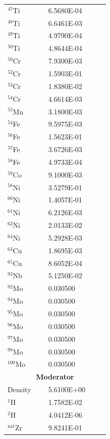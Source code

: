 \documentclass[8pt,a5paper]{article}
\begin{document}
\begin{longtable}{|m{0.3\linewidth}|m{0.45\linewidth}|}
    $^{47}$Ti & \SI{6.5680E-04}{} \\
    $^{48}$Ti & \SI{6.6461E-03}{} \\
    $^{49}$Ti & \SI{4.9790E-04}{} \\
    $^{50}$Ti & \SI{4.8644E-04}{} \\
    $^{50}$Cr & \SI{7.9300E-03}{} \\
    $^{52}$Cr & \SI{1.5903E-01}{} \\
    $^{53}$Cr & \SI{1.8380E-02}{} \\
    $^{54}$Cr & \SI{4.6614E-03}{} \\
    $^{55}$Mn & \SI{3.1800E-03}{} \\
    $^{54}$Fe & \SI{9.5975E-03}{} \\
    $^{56}$Fe & \SI{1.5623E-01}{} \\
    $^{57}$Fe & \SI{3.6726E-03}{} \\
    $^{58}$Fe & \SI{4.9733E-04}{} \\
    $^{59}$Co & \SI{9.1000E-03}{} \\
    $^{58}$Ni & \SI{3.5279E-01}{} \\
    $^{60}$Ni & \SI{1.4057E-01}{} \\
    $^{61}$Ni & \SI{6.2126E-03}{} \\
    $^{62}$Ni & \SI{2.0133E-02}{} \\
    $^{64}$Ni & \SI{5.2928E-03}{} \\
    $^{63}$Cu & \SI{1.8695E-03}{} \\
    $^{65}$Cu & \SI{8.6052E-04}{} \\
    $^{93}$Nb & \SI{5.1250E-02}{} \\
    $^{92}$Mo & \SI{0.030500}{} \\
    $^{94}$Mo & \SI{0.030500}{} \\
    $^{95}$Mo & \SI{0.030500}{} \\
    $^{96}$Mo & \SI{0.030500}{} \\
    $^{97}$Mo & \SI{0.030500}{} \\
    $^{98}$Mo & \SI{0.030500}{} \\
    $^{100}$Mo & \SI{0.030500}{} \\\hline
    \multicolumn{2}{|c|}{\textbf{Moderator}}\\\hline
    Density & \SI{5.6100E+00}{} \\
    $^{1}$H & \SI{1.7582E-02}{} \\
    $^{2}$H & \SI{4.0412E-06}{} \\
    $^{\text{nat}}$Zr & \SI{9.8241E-01}{} \\\hline

\end{longtable}
\end{document}
